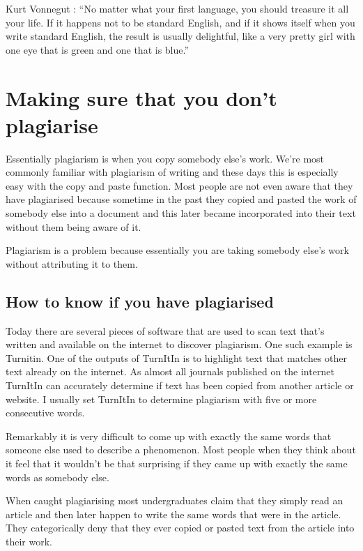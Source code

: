\documentclass[
]{krantz}
\renewenvironment{quote}{\begin{VF}}{\end{VF}}
\begin{document}
\begin{quote}
Kurt Vonnegut \citeyearpar{vonnegut1982how}:
``No matter what your first language, you should treasure it all your life. If it happens not to be standard English, and if it shows itself when you write standard English, the result is usually delightful, like a very pretty girl with one eye that is green and one that is blue.''
\end{quote}

\hypertarget{plagiarise}{%
\section{Making sure that you don't plagiarise}\label{plagiarise}}

Essentially plagiarism is when you copy somebody else's work. We're most commonly familiar with plagiarism of writing and these days this is especially easy with the copy and paste function. Most people are not even aware that they have plagiarised because sometime in the past they copied and pasted the work of somebody else into a document and this later became incorporated into their text without them being aware of it.

Plagiarism is a problem because essentially you are taking somebody else's work without attributing it to them.

\hypertarget{how-to-know-if-you-have-plagiarised}{%
\subsection{How to know if you have plagiarised}\label{how-to-know-if-you-have-plagiarised}}

Today there are several pieces of software that are used to scan text that's written and available on the internet to discover plagiarism. One such example is Turnitin. One of the outputs of TurnItIn is to highlight text that matches other text already on the internet. As almost all journals published on the internet TurnItIn can accurately determine if text has been copied from another article or website.
I usually set TurnItIn to determine plagiarism with five or more consecutive words.

Remarkably it is very difficult to come up with exactly the same words that someone else used to describe a phenomenon. Most people when they think about it feel that it wouldn't be that surprising if they came up with exactly the same words as somebody else.

When caught plagiarising most undergraduates claim that they simply read an article and then later happen to write the same words that were in the article. They categorically deny that they ever copied or pasted text from the article into their work.
\end{document}
